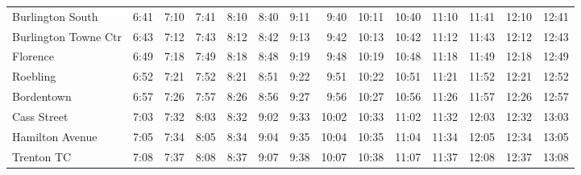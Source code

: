 \begin{center}
\begin{tabular}{@{}lrrrrrrrrrrrrr@{}}
Burlington South & 6:41 & 7:10 & 7:41 & 8:10 & 8:40 & 9:11 & 9:40 & 10:11 & 10:40 & 11:10 & 11:41 & 12:10 & 12:41 \\
Burlington Towne Ctr & 6:43 & 7:12 & 7:43 & 8:12 & 8:42 & 9:13 & 9:42 & 10:13 & 10:42 & 11:12 & 11:43 & 12:12 & 12:43 \\
Florence & 6:49 & 7:18 & 7:49 & 8:18 & 8:48 & 9:19 & 9:48 & 10:19 & 10:48 & 11:18 & 11:49 & 12:18 & 12:49 \\
Roebling & 6:52 & 7:21 & 7:52 & 8:21 & 8:51 & 9:22 & 9:51 & 10:22 & 10:51 & 11:21 & 11:52 & 12:21 & 12:52 \\
Bordentown & 6:57 & 7:26 & 7:57 & 8:26 & 8:56 & 9:27 & 9:56 & 10:27 & 10:56 & 11:26 & 11:57 & 12:26 & 12:57 \\
Cass Street & 7:03 & 7:32 & 8:03 & 8:32 & 9:02 & 9:33 & 10:02 & 10:33 & 11:02 & 11:32 & 12:03 & 12:32 & 13:03 \\
Hamilton Avenue & 7:05 & 7:34 & 8:05 & 8:34 & 9:04 & 9:35 & 10:04 & 10:35 & 11:04 & 11:34 & 12:05 & 12:34 & 13:05 \\
Trenton TC & 7:08 & 7:37 & 8:08 & 8:37 & 9:07 & 9:38 & 10:07 & 10:38 & 11:07 & 11:37 & 12:08 & 12:37 & 13:08 \\
\bottomrule\end{tabular}\end{center}
